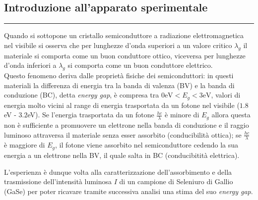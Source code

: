 \begin{center}
  \section{Introduzione all'apparato sperimentale}
\end{center}
\medskip
{\color{gray}\hrule}
\medskip
Quando si sottopone un cristallo semiconduttore a radiazione elettromagnetica nel visibile si osserva che per lunghezze d'onda superiori a un valore critico $\lambda_g$ il materiale si comporta come un buon conduttore ottico, viceversa per lunghezze d'onda inferiori a $\lambda_g$ si comporta come un buon conduttore elettrico. \\
Questo fenomeno deriva dalle proprietà fisiche dei semiconduttori: in questi materiali la differenza di energia tra la banda di valenza (BV) e la banda di conduzione (BC), detta \textit{energy gap}, è compresa tra $0\text{eV}<E_g<3\text{eV}$, valori di energia molto vicini al range di energia trasportata da un fotone nel visibile ($1.8$eV - $3.2$eV). Se l'energia trasportata da un fotone $\frac{hc}{\lambda}$ è minore di $E_g$ allora questa non è sufficiente a promuovere un elettrone nella banda di conduzione e il raggio luminoso attraversa il materiale senza esser assorbito (conducibilità ottica); se $\frac{hc}{\lambda}$ è maggiore di $E_g$, il fotone viene assorbito nel semiconduttore cedendo la sua energia a un elettrone nella BV, il quale salta in BC (conducibitità elettrica).

L'esperienza è dunque volta alla caratterizzazione dell'assorbimento e della trasmissione dell'intensità luminosa $I$ di un campione di Seleniuro di Gallio (GaSe) per poter ricavare tramite successiva analisi una stima del suo \textit{energy gap}.
